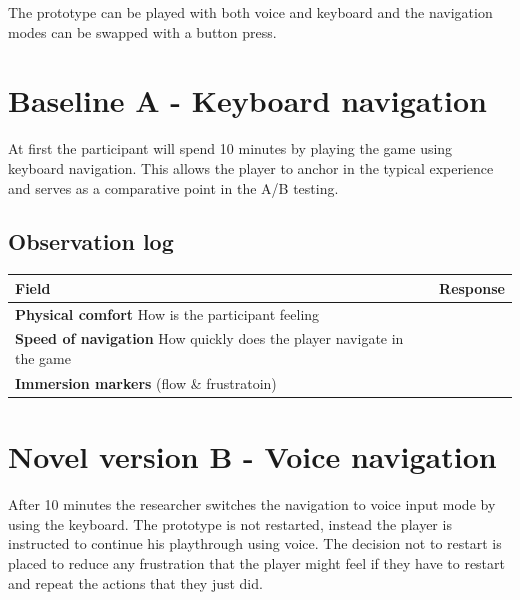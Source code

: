 The prototype can be played with both voice and keyboard and the navigation modes can be swapped with a button press. 

\section{Baseline A - Keyboard navigation}
At first the participant will spend 10 minutes by playing the game using keyboard navigation.
This allows the player to anchor in the typical experience and serves as a comparative point in the A/B testing.

\subsection{Observation log}
\begin{table}[h]
\centering
\begin{tabular}{|p{5cm}|p{10cm}|}
\hline
\textbf{Field} & \textbf{Response} \\ \hline
\textbf{Physical comfort} How is the participant feeling & \\[1.5cm] \hline
\textbf{Speed of navigation} How quickly does the player navigate in the game & \\[1.5cm] \hline
\textbf{Immersion markers} (flow \& frustratoin) & \\[1.5cm] \hline
\end{tabular}
\end{table}

\section{Novel version B - Voice navigation}
After 10 minutes the researcher switches the navigation to voice input mode by using the keyboard. The prototype is not restarted,
instead the player is instructed to continue his playthrough using voice. The decision not to restart is placed to reduce any frustration that the player
might feel if they have to restart and repeat the actions that they just did.

